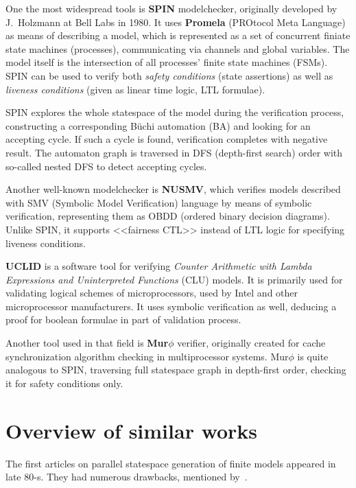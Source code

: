 \documentclass[a4paper,notitlepage,14pt]{article}
\begin{document}
One the most widespread tools is \textbf{SPIN} modelchecker, originally developed by
J.~Holzmann at Bell Labs in 1980. It uses \textbf{Promela} (PROtocol Meta Language) as
means of describing a model, which is represented as a set of concurrent finiate state
machines (processes), communicating via channels and global variables. The model itself
is the intersection of all processes' finite state machines (FSMs). SPIN can be used
to verify both \emph{safety conditions} (state assertions) as well as \emph{liveness
  conditions} (given as linear time logic, LTL formulae).

SPIN explores the whole statespace of the model during the verification process,
constructing a corresponding B\"{u}chi automation (BA) and looking for an accepting
cycle. If such a cycle is found, verification completes with negative result. The
automaton graph is traversed in DFS (depth-first search) order with so-called nested
DFS to detect accepting cycles.

Another well-known modelchecker is \textbf{NUSMV}, which verifies models described with SMV
(Symbolic Model Verification) language by means of symbolic verification, representing
them as OBDD (ordered binary decision diagrams). Unlike SPIN, it supports <<fairness CTL>>
instead of LTL logic for specifying liveness conditions.

\textbf{UCLID} is a software tool for verifying \emph{Counter Arithmetic with Lambda
  Expressions and Uninterpreted Functions} (CLU) models. It is primarily used for
validating logical schemes of microprocessors, used by Intel and other microprocessor
manufacturers. It uses symbolic verification as well, deducing a proof for boolean
formulae in part of validation process.

Another tool used in that field is \textbf{Mur$\phi$} verifier, originally created for cache
synchronization algorithm checking in multiprocessor systems. Mur$\phi$ is quite analogous
to SPIN, traversing full statespace graph in depth-first order, checking it for safety
conditions only.

\section{Overview of similar works}
\label{sec:overv-simil-works}

The first articles on parallel statespace generation of finite models appeared in late
80-s. They had numerous drawbacks, mentioned by~\cite{Stern97parallelizingthe}.
\end{document}
